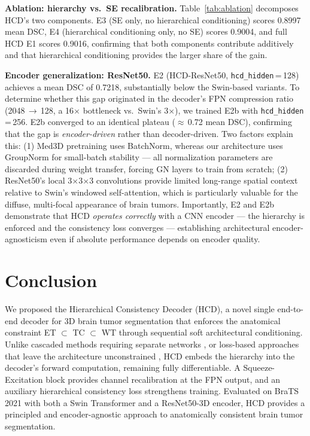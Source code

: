\documentclass[conference]{IEEEtran}
\begin{document}
\textbf{Ablation: hierarchy vs.\ SE recalibration.}
Table~\ref{tab:ablation} decomposes HCD's two components.
E3 (SE only, no hierarchical conditioning) scores 0.8997 mean DSC,
E4 (hierarchical conditioning only, no SE) scores 0.9004, and
full HCD E1 scores 0.9016, confirming that both components contribute
additively and that hierarchical conditioning provides the larger share
of the gain.

\textbf{Encoder generalization: ResNet50.}
E2 (HCD-ResNet50, \texttt{hcd\_hidden}\,=\,128) achieves a mean DSC
of 0.7218, substantially below the Swin-based variants.
To determine whether this gap originated in the decoder's FPN
compression ratio (2048\,$\to$\,128, a 16$\times$ bottleneck vs.\
Swin's 3$\times$), we trained E2b with \texttt{hcd\_hidden}\,=\,256.
E2b converged to an identical plateau ($\approx$\,0.72 mean DSC),
confirming that the gap is \emph{encoder-driven} rather than
decoder-driven.
Two factors explain this: (1) Med3D pretraining uses BatchNorm,
whereas our architecture uses GroupNorm for small-batch stability ---
all normalization parameters are discarded during weight transfer,
forcing GN layers to train from scratch;
(2) ResNet50's local 3$\times$3$\times$3 convolutions provide limited
long-range spatial context relative to Swin's windowed self-attention,
which is particularly valuable for the diffuse, multi-focal appearance
of brain tumors.
Importantly, E2 and E2b demonstrate that HCD \emph{operates correctly}
with a CNN encoder --- the hierarchy is enforced and the consistency loss
converges --- establishing architectural encoder-agnosticism even if
absolute performance depends on encoder quality.

\section{Conclusion}

We proposed the Hierarchical Consistency Decoder (HCD), a novel
single end-to-end decoder for 3D brain tumor segmentation that enforces
the anatomical constraint ET $\subset$ TC $\subset$ WT through
sequential soft architectural conditioning. Unlike cascaded methods
requiring separate networks \cite{cascade_brain}, or loss-based
approaches that leave the architecture unconstrained
\cite{kervadec_constrained}, HCD embeds the hierarchy into the
decoder's forward computation, remaining fully differentiable.
A Squeeze-Excitation block \cite{se_net} provides channel recalibration
at the FPN output, and an auxiliary hierarchical consistency loss
strengthens training. Evaluated on BraTS 2021 \cite{brats2021} with
both a Swin Transformer \cite{liu_swin} and a ResNet50-3D
\cite{he_resnet} encoder, HCD provides a principled and
encoder-agnostic approach to anatomically consistent brain tumor
segmentation.
\end{document}
